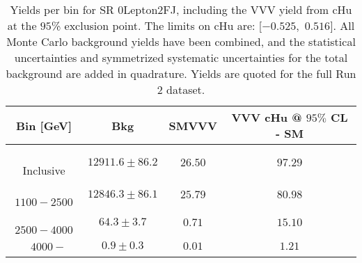 \begin{table}[!htbp]
    \small
    \center
    \begin{tabular}{c||c|c|c}
    Bin [GeV] & Bkg & SMVVV & \pbox{20cm}{VVV \\ cHu @ $95\%$ CL - SM \\ }\\
    \hline
    \pbox{20cm}{ ~ \\Inclusive\\ } & $12911.6 \pm 86.2$ & $26.50$ & $97.29$\\
    \hline
    \pbox{20cm}{ ~ \\$1100-2500$\\ } & $12846.3 \pm 86.1$ & $25.79$ & $80.98$\\
    \hline
    \pbox{20cm}{ ~ \\$2500-4000$\\ } & $64.3 \pm 3.7$ & $0.71$ & $15.10$\\
    \hline
    \pbox{20cm}{ ~ \\$4000-$\\ } & $0.9 \pm 0.3$ & $0.01$ & $1.21$\\
\end{tabular}
    \caption{Yields per bin for SR 0Lepton2FJ, including the VVV yield from cHu at the $95$\% exclusion point. The limits on cHu are: [$-0.525$,~$0.516$]. All Monte Carlo background yields have been combined, and the statistical uncertainties and symmetrized systematic uncertainties for the total background are added in quadrature. Yields are quoted for the full Run 2 dataset.}
    \label{tab:0Lepton2FJ$binssignal}
\end{table}

